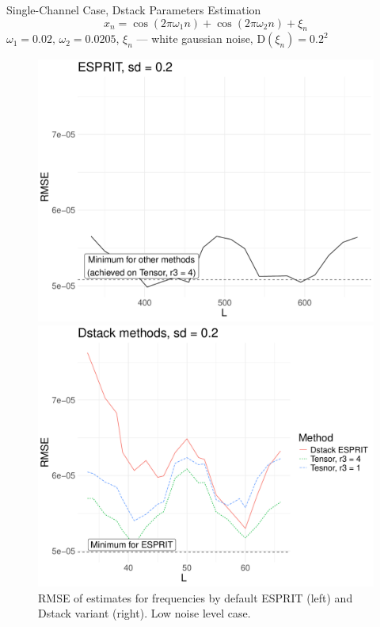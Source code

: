 \documentclass[pdf, unicode, ucs, notheorems]{beamer}
\theoremstyle{definition}
\begin{document}
\begin{frame}{Single-Channel Case, Dstack Parameters Estimation}
  \vspace*{-0.3cm}
  \[
    x_{n} = \cos(2 \pi \omega_1 n) +
    \cos(2 \pi \omega_2 n) + \xi_n
  \]
  $\omega_1 = 0.02,\, \omega_2 = 0.0205$, $\xi_n$ --- white gaussian
  noise, $\mathrm{D}(\xi_n) = 0.2^2$

  \begin{figure}[!ht]
    \begin{minipage}{0.48\textwidth}
      \centering
      \includegraphics[width=\textwidth]{img/htlsd_byL_real_param_rmse_esprit_2.pdf}
    \end{minipage}
    \begin{minipage}{0.48\textwidth}
      \centering
      \includegraphics[width=\textwidth]{img/htlsd_byL_real_param_rmse_dstack_2.pdf}
    \end{minipage}
    \caption{RMSE of estimates for frequencies by default ESPRIT
    (left) and Dstack variant (right). Low noise level case.}
  \end{figure}
\end{frame}
\end{document}
